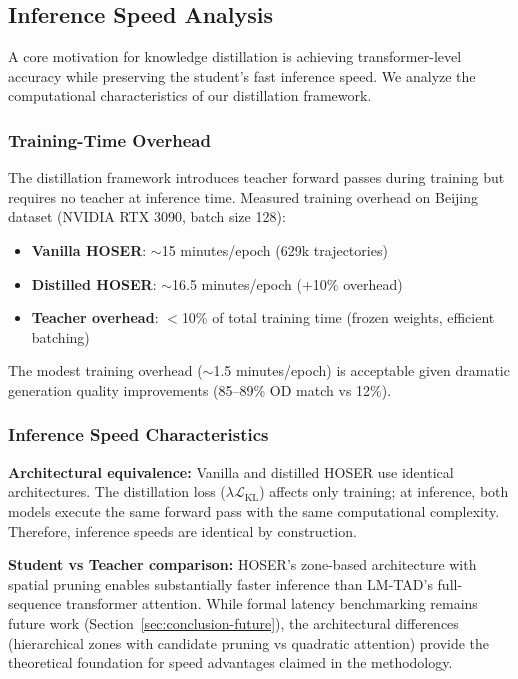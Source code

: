 \subsection{Inference Speed Analysis}
\label{sec:eval-inference}

A core motivation for knowledge distillation is achieving transformer-level accuracy while preserving the student's fast inference speed. We analyze the computational characteristics of our distillation framework.

\subsubsection{Training-Time Overhead}

The distillation framework introduces teacher forward passes during training but requires no teacher at inference time. Measured training overhead on Beijing dataset (NVIDIA RTX 3090, batch size 128):

\begin{itemize}[noitemsep,topsep=0pt]
    \item \textbf{Vanilla HOSER}: $\sim$15 minutes/epoch (629k trajectories)
    \item \textbf{Distilled HOSER}: $\sim$16.5 minutes/epoch (+10\% overhead)
    \item \textbf{Teacher overhead}: $<$10\% of total training time (frozen weights, efficient batching)
\end{itemize}

The modest training overhead ($\sim$1.5 minutes/epoch) is acceptable given dramatic generation quality improvements (85--89\% OD match vs 12\%).

\subsubsection{Inference Speed Characteristics}

\textbf{Architectural equivalence:} Vanilla and distilled HOSER use identical architectures. The distillation loss ($\lambda \mathcal{L}_{\text{KL}}$) affects only training; at inference, both models execute the same forward pass with the same computational complexity. Therefore, inference speeds are identical by construction.

\textbf{Student vs Teacher comparison:} HOSER's zone-based architecture with spatial pruning enables substantially faster inference than LM-TAD's full-sequence transformer attention. While formal latency benchmarking remains future work (Section~\ref{sec:conclusion-future}), the architectural differences (hierarchical zones with candidate pruning vs quadratic attention) provide the theoretical foundation for speed advantages claimed in the methodology.

